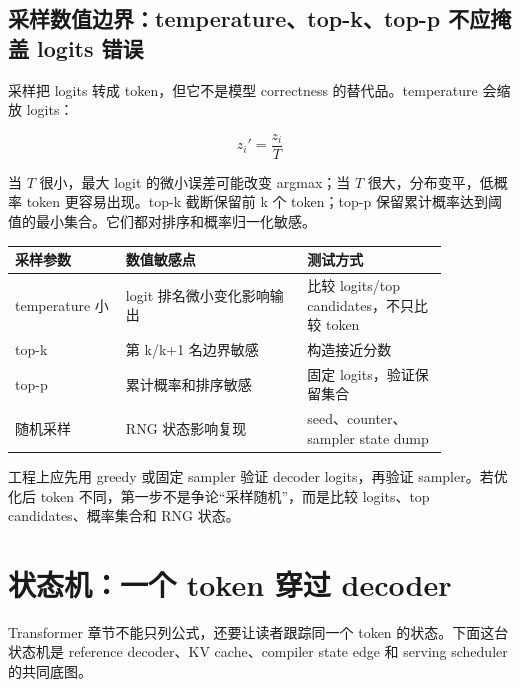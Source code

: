 \subsection{采样数值边界：temperature、top-k、top-p 不应掩盖 logits 错误}

采样把 logits 转成 token，但它不是模型 correctness 的替代品。temperature 会缩放 logits：

\[
z_i' = \frac{z_i}{T}
\]

当 \(T\) 很小，最大 logit 的微小误差可能改变 argmax；当 \(T\) 很大，分布变平，低概率 token 更容易出现。top-k 截断保留前 k 个 token；top-p 保留累计概率达到阈值的最小集合。它们都对排序和概率归一化敏感。

\begin{center}
\begin{tabular}{p{0.22\linewidth}p{0.36\linewidth}p{0.28\linewidth}}
\toprule
采样参数 & 数值敏感点 & 测试方式 \\
\midrule
temperature 小 & logit 排名微小变化影响输出 & 比较 logits/top candidates，不只比较 token \\
top-k & 第 k/k+1 名边界敏感 & 构造接近分数 \\
top-p & 累计概率和排序敏感 & 固定 logits，验证保留集合 \\
随机采样 & RNG 状态影响复现 & seed、counter、sampler state dump \\
\bottomrule
\end{tabular}
\end{center}

工程上应先用 greedy 或固定 sampler 验证 decoder logits，再验证 sampler。若优化后 token 不同，第一步不是争论“采样随机”，而是比较 logits、top candidates、概率集合和 RNG 状态。

\section{状态机：一个 token 穿过 decoder}

Transformer 章节不能只列公式，还要让读者跟踪同一个 token 的状态。下面这台状态机是 reference decoder、KV cache、compiler state edge 和 serving scheduler 的共同底图。

